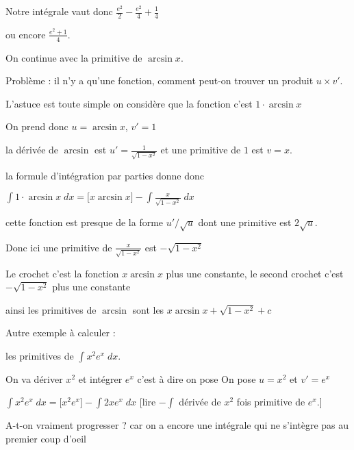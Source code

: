 Notre intégrale vaut donc $ \tfrac{e^2}{2} - \tfrac{e^2}{4} + \tfrac{1}{4}$

ou encore $\tfrac{e^2+1}{4}$.


\diapo

On continue avec la primitive de  $\arcsin x$. 

Problème : il n'y a qu'une fonction, comment peut-on trouver un produit $u \times v'$.

\change

L'astuce est toute simple on considère que la fonction
c'est $1 \cdot \arcsin x$

\change


On prend donc  $u=\arcsin x$, $v'=1$ 

\change 

la dérivée de $\arcsin$ est $u'=\frac{1}{\sqrt{1-x^2}}$ et une primitive de $1$ est $v=x$.

\change 

la formule d'intégration par parties donne donc 

$\int 1\cdot \arcsin x \; dx = \big[x\arcsin x\big] - \int \frac{x}{\sqrt{1-x^2}} \; dx$

cette fonction est presque de la forme $u'/\sqrt{u}$ dont une primitive est $2\sqrt{u}$.

\change

Donc ici une primitive de $\frac{x}{\sqrt{1-x^2}}$ est $-\sqrt {1-x^2}$

\change

Le crochet c'est la fonction $x\arcsin x$ plus une constante,
le second crochet c'est $-\sqrt {1-x^2}$ plus une constante 

ainsi les primitives de $\arcsin$ sont les 
 $x\arcsin x+ \sqrt {1-x^2}+c$


\change

Autre exemple à calculer : 

\change

les primitives de $\int x^2e^x \; dx$.

\change

On va dériver $x^2$ et intégrer $e^x$ c'est à dire on pose 
On pose $u=x^2$ et $v'=e^x$ 

\change

$\int x^2e^x \; dx = \big[ x^2e^x \big] - \int 2x e^x \; dx$
[lire $-\int$ dérivée de $x^2$ fois primitive de $e^x$.]

\change

A-t-on vraiment progresser ? car on a encore une intégrale qui ne s'intègre pas
au premier coup d’oeil

